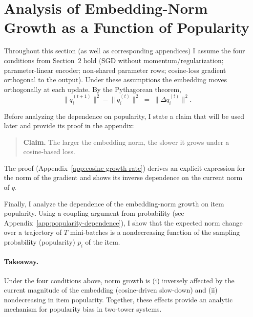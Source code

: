 \section{Analysis of Embedding-Norm Growth as a Function of Popularity}

Throughout this section (as well as corresponding appendices) I assume the four conditions from Section~2 hold (SGD without momentum/regularization; parameter-linear encoder; non-shared parameter rows; cosine-loss gradient orthogonal to the output). Under these assumptions the embedding moves orthogonally at each update. By the Pythagorean theorem,
\begin{equation}
\label{eq:pythagoras-increment}
\bigl\|q_i^{(t+1)}\bigr\|^{2} - \bigl\|q_i^{(t)}\bigr\|^{2} \;=\; \bigl\|\Delta q_i^{(t)}\bigr\|^{2}.
\end{equation}

Before analyzing the dependence on popularity, I state a claim that will be used later and provide its proof in the appendix:
\begin{quote}
\textbf{Claim.} The larger the embedding norm, the slower it grows under a cosine-based loss.
\end{quote}
The proof (Appendix~\ref{app:cosine-growth-rate}) derives an explicit expression for the norm of the gradient and shows its inverse dependence on the current norm of $q$.

Finally, I analyze the dependence of the embedding-norm growth on item popularity. Using a coupling argument from probability (see Appendix~\ref{app:popularity-dependence}), I show that the expected norm change over a trajectory of $T$ mini-batches is a nondecreasing function of the sampling probability (popularity) $p_i$ of the item.

\paragraph{Takeaway.} Under the four conditions above, norm growth is (i) inversely affected by the current magnitude of the embedding (cosine-driven slow-down) and (ii) nondecreasing in item popularity. Together, these effects provide an analytic mechanism for popularity bias in two-tower systems.


